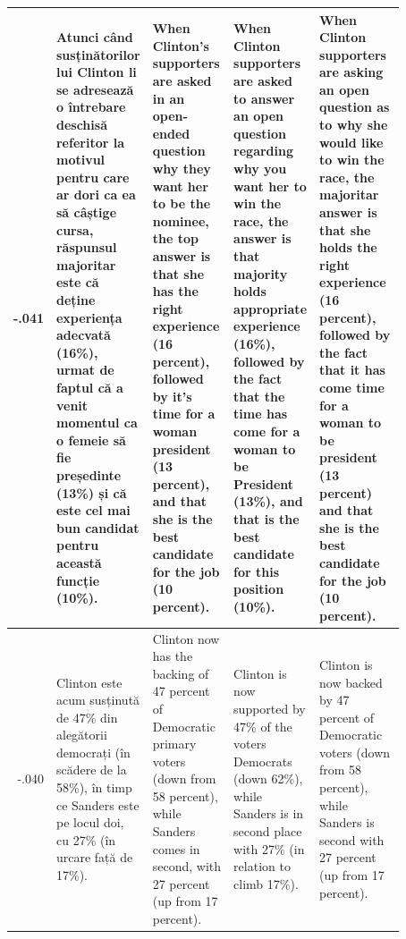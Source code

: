 \begin{table}[ht]
\begin{tabular}{r @{\hspace{1mm}} p{0.21\linewidth}p{0.21\linewidth}p{0.21\linewidth}p{0.24\linewidth}}
-.041 & Atunci când susținătorilor lui Clinton li se adresează o întrebare deschisă referitor la motivul pentru care ar dori ca ea să câștige cursa, răspunsul majoritar este că deține experiența adecvată (16\%), urmat de faptul că a venit momentul ca o femeie să fie președinte (13\%) și că este cel mai bun candidat pentru această funcție (10\%). & When Clinton's supporters are asked in an open-ended question why they want her to be the nominee, the top answer is that she has the right experience (16 percent), followed by it's time for a woman president (13 percent), and that she is the best candidate for the job (10 percent). & When Clinton supporters are asked to answer an open question regarding why you want her to win the race, the answer is that majority holds appropriate experience (16\%), followed by the fact that the time has come for a woman to be President (13\%), and that is the best candidate for this position (10\%). & When Clinton supporters are asking an open question as to why she would like to win the race, the majoritar answer is that she holds the right experience (16 percent), followed by the fact that it has come time for a woman to be president (13 percent) and that she is the best candidate for the job (10 percent). \\\hline
-.040 & Clinton este acum susținută de 47\% din alegătorii democrați (în scădere de la 58\%), în timp ce Sanders este pe locul doi, cu 27\% (în urcare față de 17\%). & Clinton now has the backing of 47 percent of Democratic primary voters (down from 58 percent), while Sanders comes in second, with 27 percent (up from 17 percent). & Clinton is now supported by 47\% of the voters Democrats (down 62\%), while Sanders is in second place with 27\% (in relation to climb 17\%). & Clinton is now backed by 47 percent of Democratic voters (down from 58 percent), while Sanders is second with 27 percent (up from 17 percent). \\\hline

\end{tabular}
\end{table}
